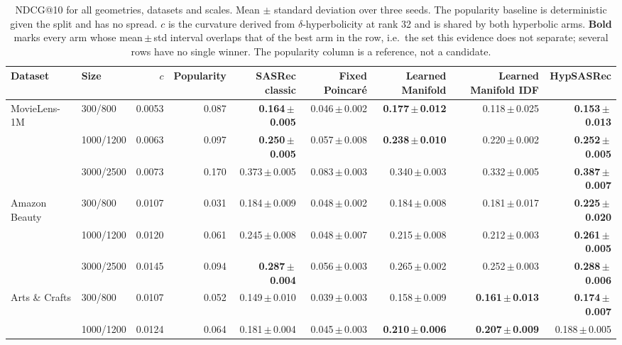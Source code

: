 \begin{table}[t]
\centering
\small
\setlength{\tabcolsep}{4pt}
\caption{NDCG@10 for all geometries, datasets and scales. Mean $\pm$ standard deviation over three seeds. The popularity baseline is deterministic given the split and has no spread. $c$ is the curvature derived from $\delta$-hyperbolicity at rank 32 and is shared by both hyperbolic arms. \textbf{Bold} marks every arm whose mean\,$\pm$\,std interval overlaps that of the best arm in the row, i.e.\ the set this evidence does not separate; several rows have no single winner. The popularity column is a reference, not a candidate.}
\label{tab:appendix-ndcg}
\begin{tabular}{llrrrrrrr}
\toprule
Dataset & Size & $c$ & Popularity & SASRec classic & Fixed Poincar\'e & Learned Manifold & Learned Manifold IDF & HypSASRec \\
\midrule
\multirow{3}{*}{MovieLens-1M} & 300/800 & 0.0053 & 0.087 & \textbf{0.164}\,$\pm$\,\textbf{0.005} & 0.046\,$\pm$\,0.002 & \textbf{0.177}\,$\pm$\,\textbf{0.012} & 0.118\,$\pm$\,0.025 & \textbf{0.153}\,$\pm$\,\textbf{0.013} \\
 & 1000/1200 & 0.0063 & 0.097 & \textbf{0.250}\,$\pm$\,\textbf{0.005} & 0.057\,$\pm$\,0.008 & \textbf{0.238}\,$\pm$\,\textbf{0.010} & 0.220\,$\pm$\,0.002 & \textbf{0.252}\,$\pm$\,\textbf{0.005} \\
 & 3000/2500 & 0.0073 & 0.170 & 0.373\,$\pm$\,0.005 & 0.083\,$\pm$\,0.003 & 0.340\,$\pm$\,0.003 & 0.332\,$\pm$\,0.005 & \textbf{0.387}\,$\pm$\,\textbf{0.007} \\
\midrule
\multirow{3}{*}{Amazon Beauty} & 300/800 & 0.0107 & 0.031 & 0.184\,$\pm$\,0.009 & 0.048\,$\pm$\,0.002 & 0.184\,$\pm$\,0.008 & 0.181\,$\pm$\,0.017 & \textbf{0.225}\,$\pm$\,\textbf{0.020} \\
 & 1000/1200 & 0.0120 & 0.061 & 0.245\,$\pm$\,0.008 & 0.048\,$\pm$\,0.007 & 0.215\,$\pm$\,0.008 & 0.212\,$\pm$\,0.003 & \textbf{0.261}\,$\pm$\,\textbf{0.005} \\
 & 3000/2500 & 0.0145 & 0.094 & \textbf{0.287}\,$\pm$\,\textbf{0.004} & 0.056\,$\pm$\,0.003 & 0.265\,$\pm$\,0.002 & 0.252\,$\pm$\,0.003 & \textbf{0.288}\,$\pm$\,\textbf{0.006} \\
\midrule
\multirow{3}{*}{Arts \& Crafts} & 300/800 & 0.0107 & 0.052 & 0.149\,$\pm$\,0.010 & 0.039\,$\pm$\,0.003 & 0.158\,$\pm$\,0.009 & \textbf{0.161}\,$\pm$\,\textbf{0.013} & \textbf{0.174}\,$\pm$\,\textbf{0.007} \\
 & 1000/1200 & 0.0124 & 0.064 & 0.181\,$\pm$\,0.004 & 0.045\,$\pm$\,0.003 & \textbf{0.210}\,$\pm$\,\textbf{0.006} & \textbf{0.207}\,$\pm$\,\textbf{0.009} & 0.188\,$\pm$\,0.005 \\

\end{tabular}
\end{table}
